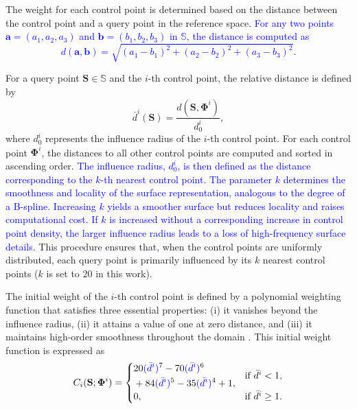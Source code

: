\documentclass[journal]{IEEEtran}
\theoremstyle{definition}
\begin{document}
The weight for each control point is determined based on the distance between the control point and a query point in the reference space. \textcolor{blue}{For any two points $\mathbf{a} = \left(a_1, a_2, a_3\right)$ and $\mathbf{b} = \left(b_1, b_2, b_3\right)$ in $\mathbb{S}$, the distance is computed as
\begin{equation}
  d(\mathbf{a},\mathbf{b}) = \sqrt{(a_1 - b_1)^2 + (a_2 - b_2)^2 + (a_3 - b_3)^2}. 
\end{equation}
} 

For a query point $\mathbf{S} \in \mathbb{S}$ and the $i$-th control point, the relative distance is defined by
\begin{equation}
  \bar{d}^i(\mathbf{S}) = \frac{d(\mathbf{S},\mathbf{\Phi}^i)}{d_0^i},
\end{equation}
where \(d_0^i\) represents the influence radius of the $i$-th control point. For each control point $\mathbf{\Phi}^i$, the distances to all other control points are computed and sorted in ascending order. \textcolor{blue}{The influence radius, $d_0^i$, is then defined as the distance corresponding to the $k$-th nearest control point. The parameter $k$ determines the smoothness and locality of the surface representation, analogous to the degree of a B-spline. Increasing $k$ yields a smoother surface but reduces locality and raises computational cost. If $k$ is increased without a corresponding increase in control point density, the larger influence radius leads to a loss of high-frequency surface details.} This procedure ensures that, when the control points are uniformly distributed, each query point is primarily influenced by its $k$ nearest control points ($k$ is set to $20$ in this work).

The initial weight of the \(i\)-th control point is defined by a polynomial weighting function that satisfies three essential properties: (i) it vanishes beyond the influence radius, (ii) it attains a value of one at zero distance, and (iii) it maintains high-order smoothness throughout the domain \cite{Maloisel_Knoop_Schumacher_Bacher_2021}. This initial weight function is expressed as 
\begin{equation}
  C_i(\mathbf{S}; \mathbf{\Phi}^i) =
  \begin{cases}
      \begin{aligned}
        &20\textcolor{blue}{(\bar{d}^{i})}^7 - 70\textcolor{blue}{(\bar{d}^{i})}^6 \\
        &+ 84\textcolor{blue}{(\bar{d}^{i})}^5 - 35\textcolor{blue}{(\bar{d}^{i})}^4 + 1,
      \end{aligned}
      & \text{if } \bar{d}^i < 1, \\[1mm]
      0, & \text{if } \bar{d}^i \ge 1.
  \end{cases}
  \label{eq:initial_weight}
\end{equation}
\end{document}
